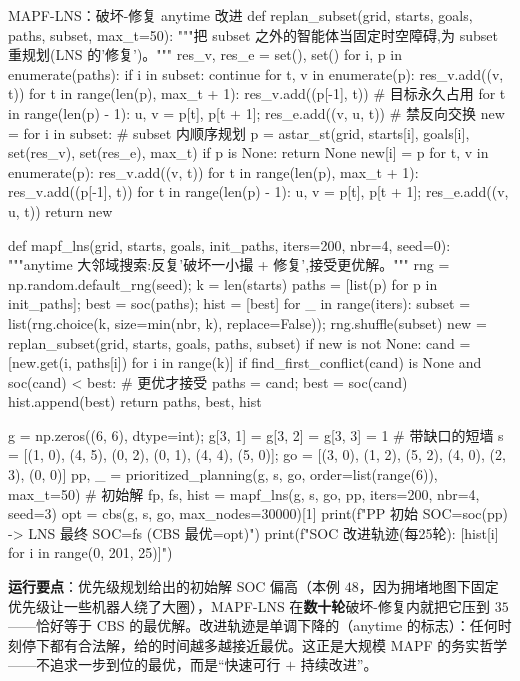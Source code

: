 \begin{codebox}[Python]{MAPF-LNS：破坏-修复 anytime 改进}
def replan_subset(grid, starts, goals, paths, subset, max_t=50):
    """把 subset 之外的智能体当固定时空障碍,为 subset 重规划(LNS 的'修复')。"""
    res_v, res_e = set(), set()
    for i, p in enumerate(paths):
        if i in subset: continue
        for t, v in enumerate(p): res_v.add((v, t))
        for t in range(len(p), max_t + 1): res_v.add((p[-1], t))     # 目标永久占用
        for t in range(len(p) - 1):
            u, v = p[t], p[t + 1]; res_e.add((v, u, t))              # 禁反向交换
    new = {}
    for i in subset:                                                  # subset 内顺序规划
        p = astar_st(grid, starts[i], goals[i], set(res_v), set(res_e), max_t)
        if p is None: return None
        new[i] = p
        for t, v in enumerate(p): res_v.add((v, t))
        for t in range(len(p), max_t + 1): res_v.add((p[-1], t))
        for t in range(len(p) - 1):
            u, v = p[t], p[t + 1]; res_e.add((v, u, t))
    return new

def mapf_lns(grid, starts, goals, init_paths, iters=200, nbr=4, seed=0):
    """anytime 大邻域搜索:反复'破坏一小撮 + 修复',接受更优解。"""
    rng = np.random.default_rng(seed); k = len(starts)
    paths = [list(p) for p in init_paths]; best = soc(paths); hist = [best]
    for _ in range(iters):
        subset = list(rng.choice(k, size=min(nbr, k), replace=False)); rng.shuffle(subset)
        new = replan_subset(grid, starts, goals, paths, subset)
        if new is not None:
            cand = [new.get(i, paths[i]) for i in range(k)]
            if find_first_conflict(cand) is None and soc(cand) < best:   # 更优才接受
                paths = cand; best = soc(cand)
        hist.append(best)
    return paths, best, hist

g = np.zeros((6, 6), dtype=int); g[3, 1] = g[3, 2] = g[3, 3] = 1     # 带缺口的短墙
s  = [(1, 0), (4, 5), (0, 2), (0, 1), (4, 4), (5, 0)]; go = [(3, 0), (1, 2), (5, 2), (4, 0), (2, 3), (0, 0)]
pp, _ = prioritized_planning(g, s, go, order=list(range(6)), max_t=50)   # 初始解
fp, fs, hist = mapf_lns(g, s, go, pp, iters=200, nbr=4, seed=3)
opt = cbs(g, s, go, max_nodes=30000)[1]
print(f"PP 初始 SOC={soc(pp)} -> LNS 最终 SOC={fs} (CBS 最优={opt})")
print(f"SOC 改进轨迹(每25轮): {[hist[i] for i in range(0, 201, 25)]}")
\end{codebox}

\textbf{运行要点}：优先级规划给出的初始解 SOC 偏高（本例 $48$，因为拥堵地图下固定优先级让一些机器人绕了大圈），MAPF-LNS 在\textbf{数十轮}破坏-修复内就把它压到 $35$——恰好等于 CBS 的最优解。改进轨迹是单调下降的（anytime 的标志）：任何时刻停下都有合法解，给的时间越多越接近最优。这正是大规模 MAPF 的务实哲学——不追求一步到位的最优，而是“快速可行 $+$ 持续改进”。

